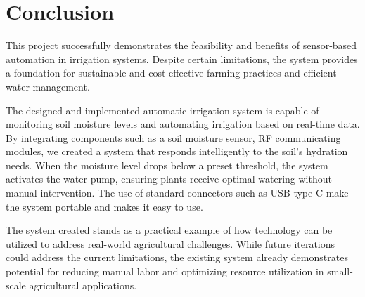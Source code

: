 \chapter{Conclusion}
This project successfully demonstrates the feasibility and benefits of sensor-based automation in irrigation systems. Despite certain limitations, the system provides a foundation for sustainable and cost-effective farming practices and efficient water management.

The designed and implemented automatic irrigation system is capable of monitoring soil moisture levels and automating irrigation based on real-time data. By integrating components such as a soil moisture sensor, RF communicating modules, we created a system that responds intelligently to the soil's hydration needs. When the moisture level drops below a preset threshold, the system activates the water pump, ensuring plants receive optimal watering without manual intervention. The use of standard connectors such as USB type C make the system portable and makes it easy to use.

The system created stands as a practical example of how technology can be utilized to address real-world agricultural challenges. While future iterations could address the current limitations, the existing system already demonstrates potential for reducing manual labor and optimizing resource utilization in small-scale agricultural applications.

